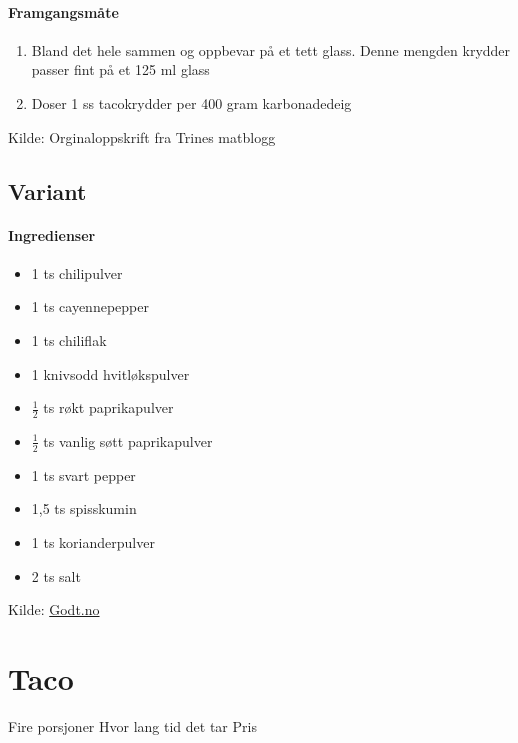 \documentclass[12pt,a4paper]{book}
\begin{document}
{\paragraph{Framgangsmåte}
\begin{enumerate}[noitemsep]
	\item Bland det hele sammen og oppbevar på et tett glass. Denne mengden krydder passer fint på et 125 ml glass
	\item Doser 1 ss tacokrydder per 400 gram karbonadedeig
\end{enumerate}

Kilde: Orginaloppskrift fra Trines matblogg

\subsection{Variant}

\paragraph{Ingredienser}
\begin{itemize}[noitemsep]
	\item 1 ts chilipulver
	\item 1 ts cayennepepper
	\item 1 ts chiliflak
	\item 1 knivsodd hvitløkspulver
	\item $\frac{1}{2}$  ts røkt paprikapulver
	\item $\frac{1}{2}$  ts vanlig søtt paprikapulver
	\item 1 ts svart pepper
	\item 1,5 ts spisskumin
	\item 1 ts korianderpulver
	\item 2 ts salt
\end{itemize}


Kilde: \href{http://www.godt.no/#!/artikkel/22127483/slik-lager-du-meksikansk-taco-helt-fra-bunnen-av}{Godt.no}
\clearpage{}
\clearpage{}\section{﻿Taco}
\label{taco}

Fire porsjoner
Hvor lang tid det tar
Pris

}
\end{document}
